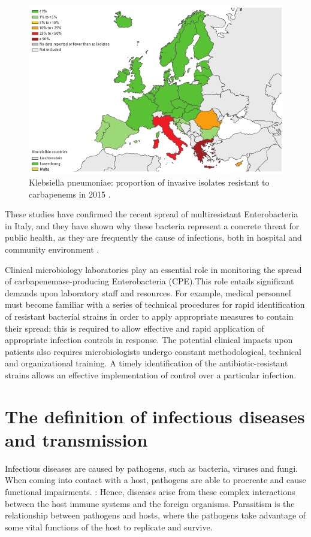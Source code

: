 \documentclass[11pt]{report}
\begin{document}
\clearpage
\begin{figure}[htp]
\centering
\includegraphics[scale=0.60]{img/K.pneu_2015.png}
\caption{Klebsiella pneumoniae: proportion of invasive isolates resistant to carbapenems in 2015 \cite{ECDC_Surveillance}.}
\label{}
\end{figure}

These studies have confirmed the recent spread of multiresistant Enterobacteria in Italy, and they have shown why these bacteria represent a concrete threat for public health, as they are frequently the cause of infections, both in hospital and community environment \cite{circolare2013}.

Clinical microbiology laboratories play an essential role in monitoring the spread of carbapenemase-producing Enterobacteria (CPE).This role entails significant demands upon laboratory staff and resources. For example, medical personnel must become familiar with a series of technical procedures for rapid identification of resistant bacterial strains in order to apply appropriate measures to contain their spread; this is required to allow effective and rapid application of appropriate infection controls in response. The potential clinical impacts upon patients also requires microbiologists undergo constant methodological, technical and organizational training. A timely identification of the antibiotic-resistant strains allows an effective implementation of control over a particular infection.

\section{The definition of infectious diseases and transmission}
Infectious diseases are caused by pathogens, such as bacteria, viruses and fungi. When coming into contact with a host, pathogens are able to procreate and cause functional impairments. :  Hence,  diseases arise from these complex interactions between the host immune systems and the foreign organisms. Parasitism is the relationship between pathogens and hosts, where the pathogens take advantage of some vital functions of the host to replicate and survive. 
\end{document}
